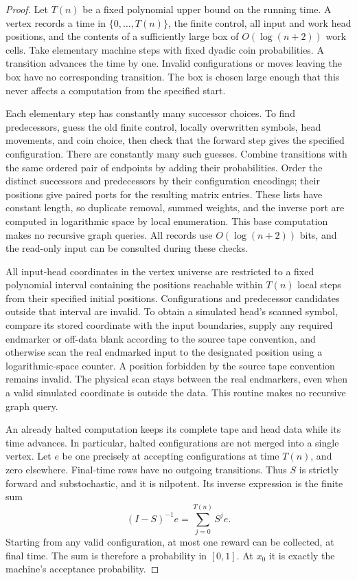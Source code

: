 \begin{proof}
Let $T(n)$ be a fixed polynomial upper bound on the running time.
A vertex records a time in $\{0,\ldots,T(n)\}$, the finite control,
all input and work head positions, and the contents of a sufficiently
large box of $O(\log(n+2))$ work cells. Take elementary machine steps
with fixed dyadic coin probabilities. A transition advances the time
by one. Invalid configurations or moves leaving the box have no
corresponding transition. The box is chosen large enough that this
never affects a computation from the specified start.

Each elementary step has constantly many successor choices.
To find predecessors, guess the old finite control, locally overwritten
symbols, head movements, and coin choice, then check that the forward
step gives the specified configuration. There are constantly many such
guesses. Combine transitions with the same ordered pair of endpoints
by adding their probabilities. Order the distinct successors and
predecessors by their configuration encodings; their positions give
paired ports for the resulting matrix entries. These lists have
constant length, so duplicate removal, summed weights, and the inverse
port are computed in logarithmic space by local enumeration. This
base computation makes no recursive graph queries. All records use
$O(\log(n+2))$ bits, and the read-only input can be consulted during
these checks.

All input-head coordinates in the vertex universe are restricted to a
fixed polynomial interval containing the positions reachable within
$T(n)$ local steps from their specified initial positions. Configurations
and predecessor candidates outside that interval are invalid. To obtain
a simulated head's scanned symbol, compare its stored coordinate with
the input boundaries, supply any required endmarker or off-data blank
according to the source tape convention, and otherwise scan the real
endmarked input to the designated position using a logarithmic-space
counter. A position forbidden by the source tape convention remains
invalid. The physical scan stays between the real endmarkers, even when
a valid simulated coordinate is outside the data. This routine makes
no recursive graph query.

An already halted computation keeps its complete tape and head data
while its time advances. In particular, halted configurations are not
merged into a single vertex. Let $e$ be one precisely at accepting
configurations at time $T(n)$, and zero elsewhere. Final-time rows
have no outgoing transitions. Thus $S$ is strictly forward and
substochastic, and it is nilpotent. Its inverse expression is the finite
sum
\[
(I-S)^{-1}e=\sum_{j=0}^{T(n)}S^je.
\]
Starting from any valid configuration, at most one reward can be
collected, at final time. The sum is therefore a probability in
$[0,1]$. At $x_0$ it is exactly the machine's acceptance probability.
\end{proof}

